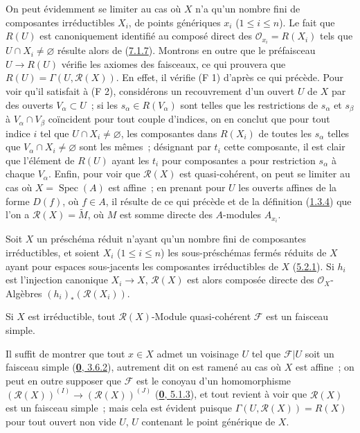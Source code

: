 On peut évidemment se limiter au cas où $X$ n'a qu'un nombre fini de
composantes irréductibles $X_i$, de points génériques $x_i$
($1\leq i\leq n$). Le fait que $R(U)$ est canoniquement identifié au composé
direct des $\mathscr{O}_{x_i}=R(X_i)$ tels que
$U\cap X_i\neq\varnothing$ résulte alors de
(\hyperref[I.7.1.7-fr]{7.1.7}). Montrons en outre que le préfaisceau
$U\to R(U)$ vérifie les axiomes des faisceaux, ce qui prouvera que
$R(U)=\Gamma(U,\mathscr{R}(X))$. En effet, il vérifie (F 1) d'après ce qui
précède. Pour voir qu'il satisfait à (F 2), considérons un recouvrement d'un
ouvert $U$ de $X$ par des ouverts $V_\alpha\subset U$~; si les
$s_\alpha\in R(V_\alpha)$ sont telles que les restrictions de $s_\alpha$ et
$s_\beta$ à $V_\alpha\cap V_\beta$ coïncident pour tout couple d'indices, on
en conclut que pour tout indice $i$ tel que $U\cap X_i\neq\varnothing$, les
composantes dans $R(X_i)$ de toutes les $s_\alpha$ telles que
$V_\alpha\cap X_i\neq\varnothing$ sont les mêmes~; désignant par $t_i$ cette
composante, il est clair que l'élément de $R(U)$ ayant les $t_i$ pour
composantes a pour restriction $s_\alpha$ à chaque $V_\alpha$. Enfin, pour
voir que $\mathscr{R}(X)$ est quasi-cohérent, on peut se limiter au cas où
$X=\operatorname{Spec}(A)$ est affine~; en prenant pour $U$ les ouverts
affines de la forme $D(f)$, où $f\in A$, il résulte de ce qui précède et de la
définition (\hyperref[I.1.3.4-fr]{1.3.4}) que l'on a
$\mathscr{R}(X)=\widetilde M$, où $M$ est somme directe des $A$-modules
$A_{x_i}$.

\begin{corollary}[7.3.4]
\label{I.7.3.4-fr}
Soit $X$ un préschéma réduit n'ayant qu'un nombre fini de composantes
irréductibles, et soient $X_i$ ($1\leq i\leq n$) les sous-préschémas fermés
réduits de $X$ ayant pour espaces sous-jacents les composantes irréductibles de
$X$ \textup{(\hyperref[I.5.2.1-fr]{5.2.1})}. Si $h_i$ est l'injection canonique
$X_i\to X$, $\mathscr{R}(X)$ est alors composée directe des
$\mathscr{O}_X$-Algèbres $(h_i)_*(\mathscr{R}(X_i))$.
\end{corollary}

\begin{corollary}[7.3.5]
\label{I.7.3.5-fr}
Si $X$ est irréductible, tout $\mathscr{R}(X)$-Module quasi-cohérent
$\mathscr{F}$ est un faisceau simple.
\end{corollary}

Il suffit de montrer que tout $x\in X$ admet un voisinage $U$ tel que
$\mathscr{F}|U$ soit un faisceau simple
(\hyperref[0.3.6.2-fr]{\textbf{0}, 3.6.2}), autrement dit on est ramené au cas où $X$
est affine~; on peut en outre supposer que $\mathscr{F}$ est le conoyau d'un
homomorphisme
$(\mathscr{R}(X))^{(I)}\to(\mathscr{R}(X))^{(J)}$
(\hyperref[0.5.1.3-fr]{\textbf{0}, 5.1.3}), et tout revient à voir que
$\mathscr{R}(X)$ est un faisceau simple~; mais cela est évident puisque
$\Gamma(U,\mathscr{R}(X))=R(X)$ pour tout ouvert non vide $U$, $U$ contenant
le point générique de $X$.


